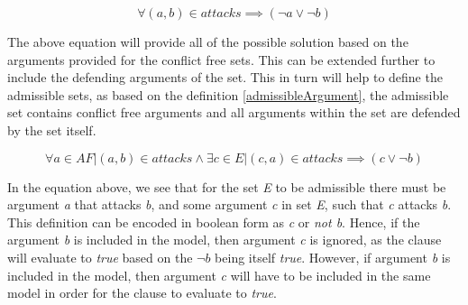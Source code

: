 \begin{equation}
	  \forall (a,b) \in attacks \implies (\neg a \lor \neg b)
\end{equation}

The above equation will provide all of the possible solution based on the arguments provided for the conflict free sets. This can be extended further to include the defending arguments of the set. This in turn will help to define the admissible sets, as based on the definition \ref{admissibleArgument}, the admissible set contains conflict free arguments and all arguments within the set are defended by the set itself.

\begin{equation}
\forall a \in AF | (a,b) \in attacks \land \exists c \in E | (c,a) \in attacks \implies (c \lor \neg b)
\end{equation}

In the equation above, we see that for the set \textit{E} to be admissible there must be argument \textit{a} that attacks \textit{b}, and some argument \textit{c} in set \textit{E}, such that \textit{c} attacks \textit{b}. This definition can be encoded in boolean form as \textit{c} or \textit{not b}. Hence, if the argument \textit{b} is included in the model, then argument \textit{c} is ignored, as the clause will evaluate to \textit{true} based on the $\neg b$ being itself \textit{true}. However, if argument \textit{b} is included in the model, then argument \textit{c} will have to be included in the same model in order for the clause to evaluate to \textit{true}.